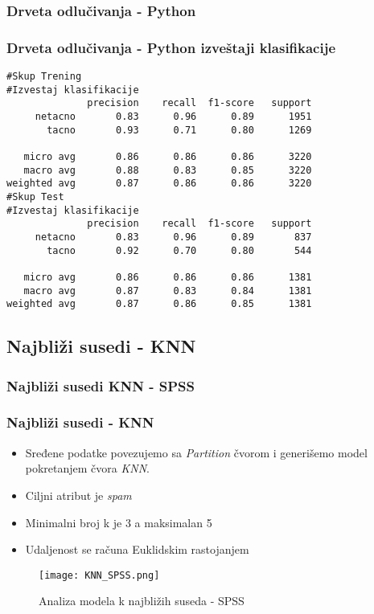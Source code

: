 \documentclass{beamer}
\begin{document}
\subsubsection*{Drveta odlučivanja - Python}
\begin{frame}[fragile]
\frametitle{Drveta odlučivanja - Python izveštaji klasifikacije}
\begin{lstlisting}
#Skup Trening
#Izvestaj klasifikacije
              precision    recall  f1-score   support
     netacno       0.83      0.96      0.89      1951
       tacno       0.93      0.71      0.80      1269

   micro avg       0.86      0.86      0.86      3220
   macro avg       0.88      0.83      0.85      3220
weighted avg       0.87      0.86      0.86      3220
#Skup Test
#Izvestaj klasifikacije
              precision    recall  f1-score   support
     netacno       0.83      0.96      0.89       837
       tacno       0.92      0.70      0.80       544

   micro avg       0.86      0.86      0.86      1381
   macro avg       0.87      0.83      0.84      1381
weighted avg       0.87      0.86      0.85      1381
\end{lstlisting}
\end{frame}

\subsection{Najbliži susedi - KNN}
\subsubsection*{Najbliži susedi KNN - SPSS}
\begin{frame}[fragile]
\frametitle{Najbliži susedi - KNN}
\begin{itemize}
\item Sređene podatke povezujemo sa \textit{Partition} čvorom i generišemo model pokretanjem čvora \textit{KNN}.
\item Ciljni atribut je \textit{spam}
\item Minimalni broj k je 3 a maksimalan 5
\item Udaljenost se računa Euklidskim rastojanjem
\end{itemize}
\begin{figure}
\begin{center}
\texttt{[image: KNN\_SPSS.png]}
\end{center}
\caption{Analiza modela k najbližih suseda - SPSS}
\end{figure}
\end{frame}
\end{document}
